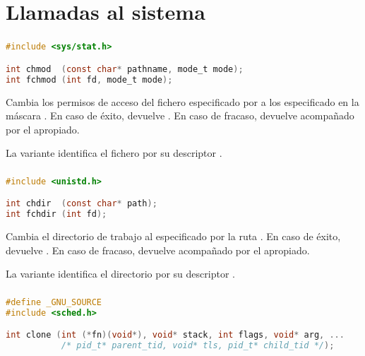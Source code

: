 \chapter{Llamadas al sistema}

\subsection{}\label{chmod}

\begin{lstlisting}[language=C]
#include <sys/stat.h>

int chmod  (const char* pathname, mode_t mode);
int fchmod (int fd, mode_t mode);
\end{lstlisting}

Cambia los permisos de acceso del fichero especificado por  a los especificado en la máscara .
En caso de éxito, devuelve .
En caso de fracaso, devuelve  acompañado por el  apropiado.

La variante  identifica el fichero por su descriptor .

\subsection{}\label{chdir}

\begin{lstlisting}[language=C]
#include <unistd.h>

int chdir  (const char* path);
int fchdir (int fd);
\end{lstlisting}

Cambia el directorio de trabajo al especificado por la ruta .
En caso de éxito, devuelve .
En caso de fracaso, devuelve  acompañado por el  apropiado.

La variante  identifica el directorio por su descriptor .

\subsection{}\label{clone}

\begin{lstlisting}[language=C]
#define _GNU_SOURCE
#include <sched.h>

int clone (int (*fn)(void*), void* stack, int flags, void* arg, ...
           /* pid_t* parent_tid, void* tls, pid_t* child_tid */);
\end{lstlisting}

